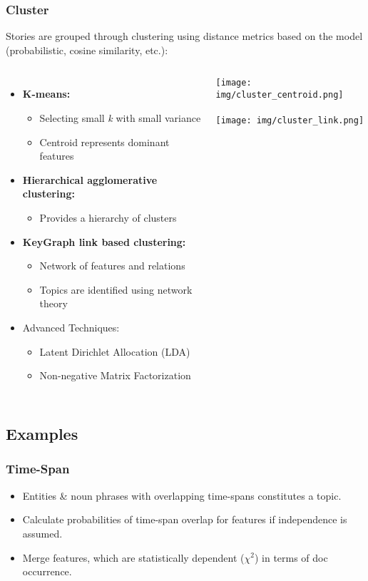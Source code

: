 \documentclass{beamer}
\begin{document}
\begin{frame}
	\frametitle{Cluster}
	Stories are grouped through clustering using distance metrics based on the
	model (probabilistic, cosine similarity, etc.):
	\begin{columns}[c]
		\column{3in}
		\begin{itemize}
			\item {\bf K-means:}
				\begin{itemize}
					\item Selecting small \emph{k} with small variance
					\item Centroid represents dominant features
				\end{itemize}
			\item {\bf Hierarchical agglomerative clustering:}
				\begin{itemize}
					\item Provides a hierarchy of clusters 
				\end{itemize}
			\item {\bf KeyGraph link based clustering:}
				\begin{itemize}
					\item Network of features and relations
					\item Topics are identified using network theory
				\end{itemize}
			\item Advanced Techniques:
				\begin{itemize}
					\item Latent Dirichlet Allocation (LDA)
					\item Non-negative Matrix Factorization
				\end{itemize}
		\end{itemize}
		\column{1in}
			\texttt{[image: img/cluster\_centroid.png]} \\
			\hfill \\
			\texttt{[image: img/cluster\_link.png]} \\
	\end{columns}
\end{frame}

\subsection{Examples}
\begin{frame}
	\frametitle{Time-Span \cite{Swan:1999:EST:319950.319956}}
	\begin{itemize}
		\item Entities \& noun phrases with overlapping time-spans constitutes a topic.
		\item Calculate probabilities of time-span overlap for features if independence is assumed.
		\item Merge features, which are statistically dependent ($\chi^2$) in terms of doc occurrence.
	\end{itemize}
\end{frame}
\end{document}
